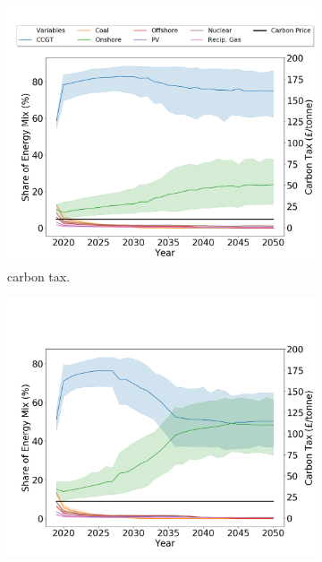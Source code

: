 \begin{figure}[h]
	\centering
	\begin{subfigure}[b]{0.6\textwidth}
		\centering
		\includegraphics[width=\textwidth]{Chapter4/figures/scenarios/demand099-carbon10-datetime.png}
		\caption[Network2]%
		{\small {} carbon tax.}
		\label{fig:demand99carbon10}
	\end{subfigure}
	\hfill
	\begin{subfigure}[b]{0.6\textwidth}  
		\centering 
		\includegraphics[width=\textwidth]{Chapter4/figures/scenarios/demand099-carbon20-datetime.png}

\end{subfigure}
\end{figure}

